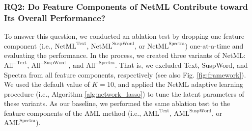 

\subsubsection{RQ2: Do Feature Components of NetML Contribute toward Its Overall Performance?}


To answer this question, we conducted an ablation test by dropping one feature component (i.e., $\text{NetML}^\text{Text}$, $\text{NetML}^\text{SuspWord}$, or $\text{NetML}^\text{Spectra}$) one-at-a-time and evaluating the performance. In the process, we created three variants of NetML: $\text{All}^{-\text{Text}}$, $\text{All}^{-\text{SuspWord}}$ , and  $\text{All}^{-\text{Spectra}}$. That is, we excluded Text, SuspWord, and Spectra from all feature components, respectively (see also Fig. \ref{fig:framework}). We used the default value of $K=10$, and applied the NetML adaptive learning procedure (i.e., Algorithm \ref{alg:network_lasso}) to tune the latent parameters of these variants. As our baseline, we performed the same ablation test to the feature components of the AML method (i.e., $\text{AML}^\text{Text}$, $\text{AML}^\text{SuspWord}$, or $\text{AML}^\text{Spectra}$).

